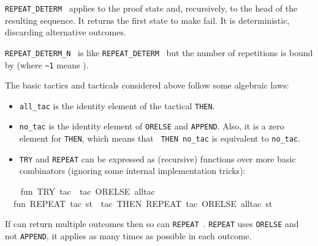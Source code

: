 \begin{isabellebody}
\begin{isamarkuptext}
\begin{description}
  \item \verb|REPEAT_DETERM|~ applies  to the
  proof state and, recursively, to the head of the resulting sequence.
  It returns the first state to make  fail.  It is
  deterministic, discarding alternative outcomes.

  \item \verb|REPEAT_DETERM_N|~ is like \verb|REPEAT_DETERM|~ but the number of repetitions is bound
  by  (where \verb|~1| means ).

  \end{description}%
\end{isamarkuptext}%
\isamarkuptrue%
%
\endisatagmlref
{\isafoldmlref}%
%
\isadelimmlref
%
\endisadelimmlref
%
\isadelimmlex
%
\endisadelimmlex
%
\isatagmlex
%
\begin{isamarkuptext}%
The basic tactics and tacticals considered above follow
  some algebraic laws:

  \begin{itemize}

  \item \verb|all_tac| is the identity element of the tactical \verb|THEN|.

  \item \verb|no_tac| is the identity element of \verb|ORELSE| and
  \verb|APPEND|.  Also, it is a zero element for \verb|THEN|,
  which means that ~\verb|THEN|~\verb|no_tac| is
  equivalent to \verb|no_tac|.

  \item \verb|TRY| and \verb|REPEAT| can be expressed as (recursive)
  functions over more basic combinators (ignoring some internal
  implementation tricks):

  \end{itemize}%
\end{isamarkuptext}%
\isamarkuptrue%
%
\endisatagmlex
{\isafoldmlex}%
%
\isadelimmlex
%
\endisadelimmlex
%
\isadelimML
%
\endisadelimML
%
\isatagML
{}\isamarkupfalse%
\ {}\isanewline
\ \ fun\ TRY\ tac\ {}\ tac\ ORELSE\ all{}tac{}\isanewline
\ \ fun\ REPEAT\ tac\ st\ {}\ {}{}tac\ THEN\ REPEAT\ tac{}\ ORELSE\ all{}tac{}\ st{}\isanewline
{}%
\endisatagML
{\isafoldML}%
%
\isadelimML
%
\endisadelimML
%
\begin{isamarkuptext}%
If  can return multiple outcomes then so can \verb|REPEAT|~.  \verb|REPEAT| uses \verb|ORELSE| and not
  \verb|APPEND|, it applies  as many times as
  possible in each outcome.


\end{isamarkuptext}
\end{isabellebody}
